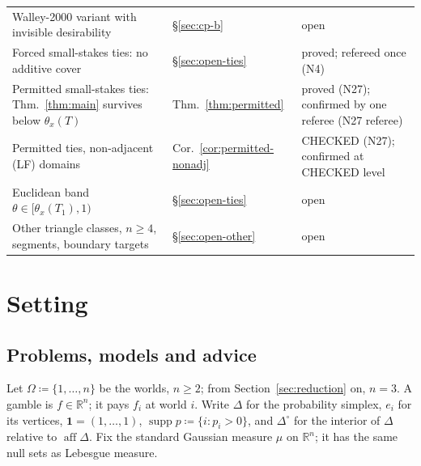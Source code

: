 \documentclass[11pt]{article}
\theoremstyle{definition}
\theoremstyle{remark}
\newcommand{\R}{\mathbb R}
\newcommand{\one}{\mathbf 1}
\newcommand{\Di}{\Delta^{\circ}}
\newcommand{\supp}{\operatorname{supp}}
\newcommand{\aff}{\operatorname{aff}}
\begin{document}
{\begin{longtable}{>{\raggedright\arraybackslash}p{6.4cm}>{\raggedright\arraybackslash}p{2.1cm}>{\raggedright\arraybackslash}p{5.6cm}}
Walley-2000 variant with invisible desirability & \S\ref{sec:cp-b} & open\\
Forced small-stakes ties: no additive cover & \S\ref{sec:open-ties} & proved; refereed once (N4)\\
Permitted small-stakes ties: Thm.~\ref{thm:main} survives below $\theta_x(T)$ & Thm.~\ref{thm:permitted} & proved (N27); confirmed by one referee (N27 referee)\\
Permitted ties, non-adjacent (LF) domains & Cor.~\ref{cor:permitted-nonadj} & CHECKED (N27); confirmed at CHECKED level\\
Euclidean band $\theta\in[\theta_x(T_1),1)$ & \S\ref{sec:open-ties} & open\\
Other triangle classes, $n\ge4$, segments, boundary targets & \S\ref{sec:open-other} & open\\
\bottomrule
\end{longtable}}

\section{Setting}\label{sec:setting}

\subsection{Problems, models and advice}
Let $\Omega\coloneqq\{1,\dots,n\}$ be the worlds, $n\ge2$; from Section~\ref{sec:reduction} on, $n=3$. A gamble is $f\in\R^n$; it pays $f_i$ at world $i$. Write $\Delta$ for the probability simplex, $e_i$ for its vertices, $\one=(1,\dots,1)$, $\supp p\coloneqq\{i:p_i>0\}$, and $\Di$ for the interior of $\Delta$ relative to $\aff\Delta$. Fix the standard Gaussian measure $\mu$ on $\R^n$; it has the same null sets as Lebesgue measure.
\end{document}
